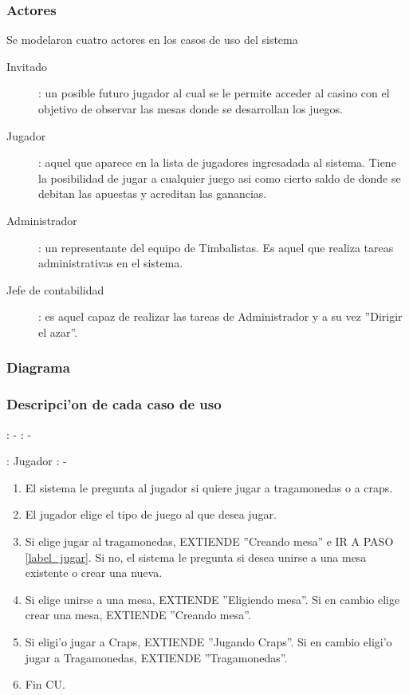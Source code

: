 \subsubsection{Actores}
Se modelaron cuatro actores en los casos de uso del sistema

\begin{description}
\item[Invitado]: un posible futuro jugador al cual se le permite acceder al casino con el objetivo de observar las mesas donde se desarrollan los juegos.
\item[Jugador]: aquel que aparece en la lista de jugadores ingresadada al sistema. Tiene la posibilidad de jugar a cualquier juego asi como cierto saldo de donde se debitan las apuestas y acreditan las ganancias.
\item[Administrador]: un representante del equipo de Timbalistas. Es aquel que realiza tareas administrativas en el sistema.
\item[Jefe de contabilidad]: es aquel capaz de realizar las tareas de Administrador y a su vez ''Dirigir el azar''.
\end{description}



\subsubsection{Diagrama}


\subsubsection{Descripci'on de cada caso de uso}

: - \newline
\indent{}: -

: Jugador \newline
\indent{}: -

\begin{enumerate}
\item El sistema le pregunta al jugador si quiere jugar a tragamonedas o a craps.
\item El jugador elige el tipo de juego al que desea jugar.
\item Si elige jugar al tragamonedas, EXTIENDE ''Creando mesa'' e IR A PASO \ref{label_jugar}. Si no, el sistema le pregunta si desea unirse a una mesa existente o crear una nueva.
\item Si elige unirse a una mesa, EXTIENDE ''Eligiendo mesa''. Si en cambio elige crear una mesa, EXTIENDE ''Creando mesa''.
\item Si eligi'o jugar a Craps, EXTIENDE ''Jugando Craps''. Si en cambio eligi'o jugar a Tragamonedas, EXTIENDE ''Tragamonedas''.\label{label_jugar}
\item Fin CU.
\end{enumerate}



